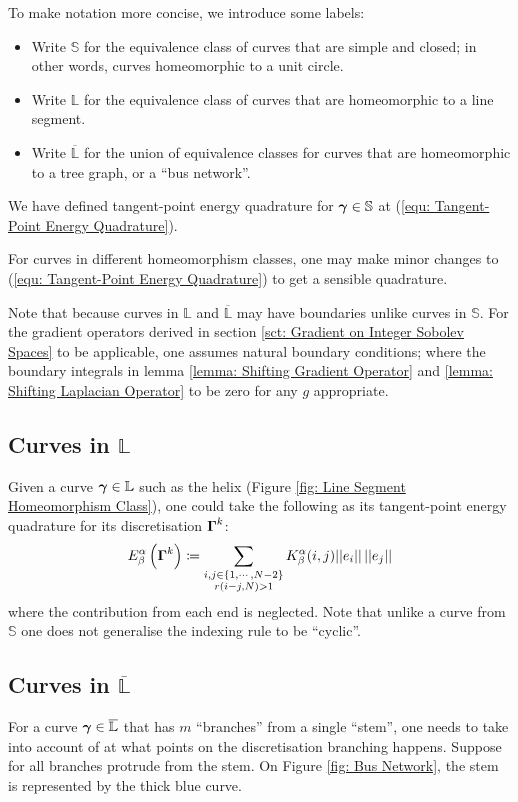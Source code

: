 \documentclass[../dissertation.tex]{subfiles}
\begin{document}
To make notation more concise, we introduce some labels:
\begin{itemize}
    \item Write $\mathbb{S}$ for the equivalence class of curves that are simple and closed; in other words, curves homeomorphic to a unit circle.
    \item Write $\mathbb{L}$ for the equivalence class of curves that are homeomorphic to a line segment.
    \item Write $\overline{\mathbb{L}}$ for the union of equivalence classes for curves that are homeomorphic to a tree graph, or a ``bus network''.
\end{itemize}

We have defined tangent-point energy quadrature for $\boldsymbol{\gamma} \in \mathbb{S}$ at (\ref{equ: Tangent-Point Energy Quadrature}).

For curves in different homeomorphism classes,
one may make minor changes to (\ref{equ: Tangent-Point Energy Quadrature}) to get a sensible quadrature.

Note that because curves in $\mathbb{L}$ and $\overline{\mathbb{L}}$ may have boundaries unlike curves in $\mathbb{S}$.
For the gradient operators derived in section \ref{sct: Gradient on Integer Sobolev Spaces} to be applicable, one assumes natural boundary conditions;
where the boundary integrals in lemma \ref{lemma: Shifting Gradient Operator} and \ref{lemma: Shifting Laplacian Operator} to be zero for any $g$ appropriate.
\subsection{Curves in $\mathbb{L}$}
Given a curve $\boldsymbol{\gamma} \in \mathbb{L}$ such as the helix (Figure \ref{fig: Line Segment Homeomorphism Class}),
one could take the following as its tangent-point energy quadrature for its discretisation $\boldsymbol{\Gamma}^k$:
\begin{equation}
    E_{\beta}^{\alpha} \left( \boldsymbol{\Gamma}^k \right) \coloneqq \sum_{\substack{i,j \in \left\{ 1, \cdots, N-2 \right\} \\ r\left( i-j,N \right) > 1}} K_{\beta}^{\alpha} (i,j) \lvert \lvert e_i \rvert \rvert \, \lvert \lvert e_j \rvert \rvert
\end{equation}
where the contribution from each end is neglected.
Note that unlike a curve from $\mathbb{S}$
one does not generalise the indexing rule to be ``cyclic''.

\subsection{Curves in $\overline{\mathbb{L}}$}
For a curve $\boldsymbol{\gamma} \in \overline{\mathbb{L}}$ that has $m$ ``branches'' from a single ``stem'', one needs to take into account of at what points on the discretisation branching happens.
Suppose for all branches protrude from the stem.
On Figure \ref{fig: Bus Network}, the stem is represented by the thick blue curve.
\end{document}
